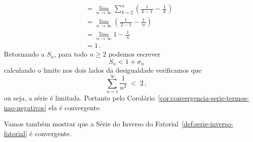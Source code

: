 \begin{example}
\begin{align*}
           & = \lim_{n\to\infty} \sum_{k=2}^n \left( \frac{1}{\,k-1\,} - \frac{1}{\,k\,}\right) \\[3mm]
           & = \lim_{n\to\infty} \left(\frac{1}{\,2-1\,} - \frac{1}{\,n\,}\right) \\[3mm]
           & = \lim_{n\to\infty} 1 - \frac{1}{\,n\,} \\[3mm]
           & = 1        \,.
  \end{align*}
  Retornando a $S_n$, para todo $n\geq 2$ podemos escrever
  \[
    S_n < 1 + \sigma_n
  \]
  calculando o limite nos dois lados da desigualdade verificamos que
  \[
    \sum_{n=1}^{\infty} \frac{1}{n^2} \;<\; 2          \,,
  \]
  ou seja, a série é limitada.
  Portanto pelo Corolário~\ref{cor:convergencia-serie-termos-nao-negativos}
  ela é convergente.
\end{example}

Vamos também mostrar que a Série do Inverso do Fatorial~\ref{def:serie-inverso-fatorial}
é convergente.

